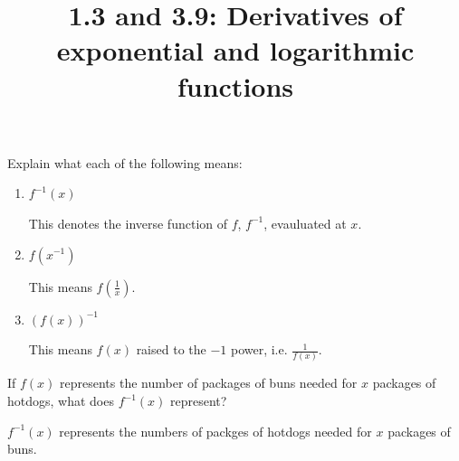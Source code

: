 \documentclass[nooutcomes]{ximera}
\title{1.3 and 3.9: Derivatives of exponential and logarithmic functions}
\begin{document}
\begin{abstract}		\end{abstract}
\maketitle

\begin{problem}
Explain what each of the following means:

  \begin{enumerate}

  \item $f^{-1}(x)$
    \begin{freeResponse}
      This denotes the inverse function of $f$, $f^{-1}$, evauluated at $x$.
    \end{freeResponse}
		
  \item $f(x^{-1})$
    \begin{freeResponse}
      This means $f \left( \frac{1}{x} \right)$.
    \end{freeResponse}
		
  \item $\left( f(x) \right)^{-1}$
    \begin{freeResponse}
      This means $f(x)$ raised to the $-1$ power,
      i.e. $\frac{1}{f(x)}$.
    \end{freeResponse}
  \end{enumerate}
\end{problem}

\begin{problem}
If $f(x)$ represents the number of packages of buns needed for $x$ packages of hotdogs, what does $f^{-1}(x)$ represent?
\begin{freeResponse}
$f^{-1}(x)$ represents the numbers of packges of hotdogs needed for $x$ packages of buns.
\end{freeResponse}

\end{problem}
\end{document}
